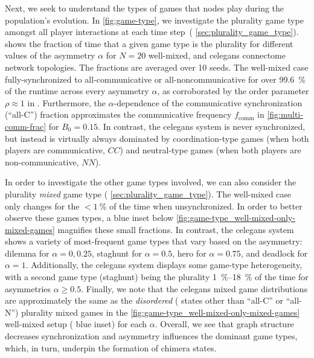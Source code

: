 \documentclass[10pt,letterpaper]{article}
\begin{document}
Next, we seek to understand the types of games
that nodes play during the population's evolution.
In \cref{fig:game-type}, we investigate the plurality game type
amongst all player interactions at each time step~(\cf{} \cref{sec:plurality_game_type}).
 shows the fraction of time
that a given game type is the plurality for different values
of the asymmetry $\alpha$ for
$N=20$ well-mixed,
and
\gls{celegans} connectome
network topologies.
The fractions are averaged over 10 seeds.
The  well-mixed case
fully-synchronized to all-communicative or all-noncommunicative
for over \SI{99.6}{\percent} of the runtime
across every asymmetry $\alpha$,
as corroborated by the order parameter $\rho \approx 1$ in
.
Furthermore,
the $\alpha$-dependence of the
communicative synchronization (``all-C'') fraction
approximates the communicative frequency $f_{\text{comm}}$
in \cref{fig:multi-comm-frac} for $B_0=0.15$.
In contrast, the
 \gls{celegans} system
is never synchronized, but instead is virtually always dominated by
coordination-type games (when both players are communicative, $CC$)
and neutral-type games (when both players are non-communicative, $NN$).

In order to investigate the other game types involved,
we can also consider the plurality \emph{mixed} game type
(\cf{} \cref{sec:plurality_game_type}).
The  well-mixed case
only changes for the $< \SI{1}{\percent}$ of the time when unsynchronized.
In order to better observe these games types,
a blue inset below \cref{fig:game-type_well-mixed-only-mixed-games}
magnifies these small fractions.
In contrast, the 
\gls{celegans} system
shows a variety of most-frequent game types
that vary based on the asymmetry:
dilemma for $\alpha = 0, 0.25$, staghunt for $\alpha = 0.5$,
hero for $\alpha = 0.75$, and deadlock for $\alpha = 1$.
Additionally, the \gls{celegans} system displays
some game-type heterogeneity, with
a second game type (staghunt) being the plurality
\SIrange{1}{18}{\percent} of the time
for asymmetries $\alpha \ge 0.5$.
Finally, we note that the \gls{celegans}
mixed game distributions
are approximately the same as the \emph{disordered}
(\ie{} states other than ``all-C'' or ``all-N'')
plurality mixed games in
the \cref{fig:game-type_well-mixed-only-mixed-games}
well-mixed setup (\cf{} blue inset) for each $\alpha$.
Overall, we see that graph structure decreases synchronization
and asymmetry influences the dominant game types, which, in turn,
underpin the formation of chimera states.
\end{document}
